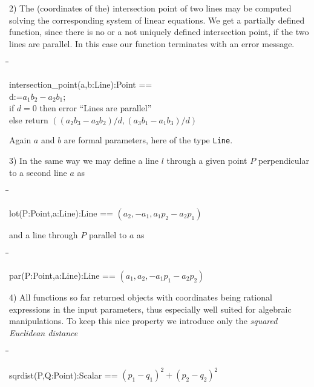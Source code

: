 \documentclass{article}
\newenvironment{code}{\tt \begin{tabbing}
\hspace*{1cm}\=\hspace*{1cm}\=\hspace*{1cm}\=
\hspace*{1cm}\=\hspace*{1cm}\=\kill
}{\end{tabbing}}
\begin{document}
2) The (coordinates of the) intersection point of two lines may be
computed solving the corresponding system of linear equations. We get
a partially defined function, since there is no or a not uniquely
defined intersection point, if the two lines are parallel. In this
case our function terminates with an error message.
\begin{code}
intersection\_point(a,b:Line):Point == \+\\
d:=$a_{1}b_{2}-a_{2}b_{1}$;\\
if $d=0$ then error ``Lines are parallel''\\
else return $((a_{2}b_{3}-a_{3}b_{2})/d,(a_{3}b_{1}-a_{1}b_{3})/d)$
\end{code}
Again $a$ and $b$ are formal parameters, here of the type {\tt Line}.

3) In the same way we may define a line $l$ through a given point $P$ 
perpendicular to a second line $a$ as
\begin{code}
lot(P:Point,a:Line):Line == $(a_{2},-a_{1},a_{1}p_{2}-a_{2}p_{1})$
\end{code}
and a line through $P$ parallel to $a$ as
\begin{code}
par(P:Point,a:Line):Line == $(a_{1},a_{2},-a_{1}p_{1}-a_{2}p_{2})$
\end{code}

4) All functions so far returned objects with coordinates being
rational expressions in the input parameters, thus especially well
suited for algebraic manipulations. To keep this nice property we
introduce only the {\em squared Euclidean distance}
\begin{code}
sqrdist(P,Q:Point):Scalar == $(p_{1}-q_{1})^{2}+(p_{2}-q_{2})^{2}$
\end{code}
\end{document}
